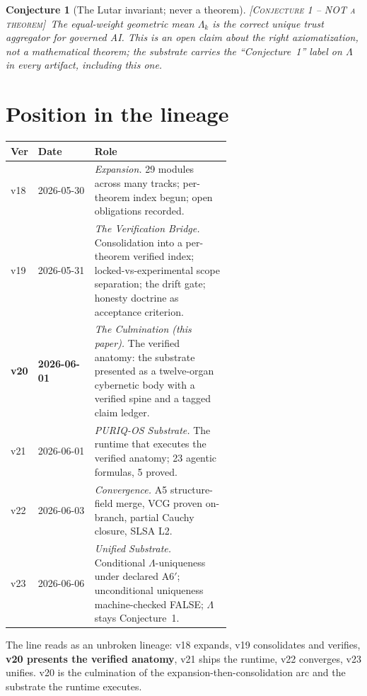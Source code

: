 \documentclass[11pt]{article}
\theoremstyle{plain}
\newtheorem{conjecture}{Conjecture}
\theoremstyle{definition}
\theoremstyle{remark}
\newcommand{\statusConj}{\textcolor{red!70!black}{\textsc{[Conjecture 1 -- NOT a theorem]}}}
\newcommand{\La}{\Lambda}
\begin{document}
\begin{conjecture}[The Lutar invariant; never a theorem]
\statusConj\ The equal-weight geometric mean $\La_k$ is the correct unique trust
aggregator for governed AI. This is an open claim about the \emph{right} axiomatization,
not a mathematical theorem; the substrate carries the ``Conjecture~1'' label on $\La$ in
every artifact, including this one.
\end{conjecture}

\section{Position in the lineage}
\label{sec:lineage}

\begin{center}
\begin{tabular}{@{}llp{0.62\linewidth}@{}}
\toprule
\textbf{Ver} & \textbf{Date} & \textbf{Role}\\
\midrule
v18 & 2026-05-30 & \emph{Expansion.} 29 modules across many tracks; per-theorem index begun; open obligations recorded.\\
v19 & 2026-05-31 & \emph{The Verification Bridge.} Consolidation into a per-theorem verified index; locked-vs-experimental scope separation; the drift gate; honesty doctrine as acceptance criterion.\\
\textbf{v20} & \textbf{2026-06-01} & \emph{The Culmination (this paper).} The verified anatomy: the substrate presented as a twelve-organ cybernetic body with a verified spine and a tagged claim ledger.\\
v21 & 2026-06-01 & \emph{PURIQ-OS Substrate.} The runtime that executes the verified anatomy; 23 agentic formulas, 5 proved.\\
v22 & 2026-06-03 & \emph{Convergence.} A5 structure-field merge, VCG proven on-branch, partial Cauchy closure, SLSA L2.\\
v23 & 2026-06-06 & \emph{Unified Substrate.} Conditional $\La$-uniqueness under declared A6$'$; unconditional uniqueness machine-checked FALSE; $\La$ stays Conjecture~1.\\
\bottomrule
\end{tabular}
\end{center}

The line reads as an unbroken lineage: v18 expands, v19 consolidates and verifies,
\textbf{v20 presents the verified anatomy}, v21 ships the runtime, v22 converges, v23
unifies. v20 is the culmination of the expansion-then-consolidation arc and the
substrate the runtime executes.
\end{document}
